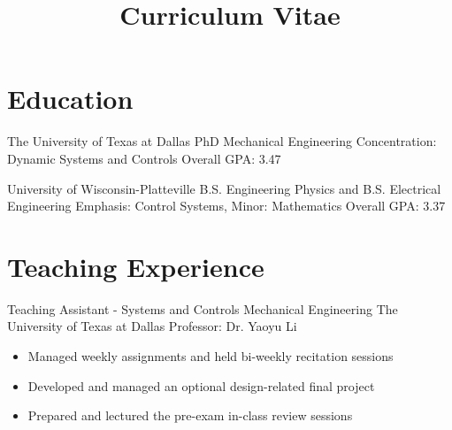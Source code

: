 \documentclass[11pt,letterpaper,roman]{moderncv} %
\title{Curriculum Vitae}
\begin{document}

\makecvtitle %

\vspace{- 1 cm}

\section{Education}

{The University of Texas at Dallas}
{PhD Mechanical Engineering}{}
{Concentration: Dynamic Systems and Controls} 
{Overall GPA: 3.47}

{University of Wisconsin-Platteville}
{B.S. Engineering Physics and  B.S. Electrical Engineering}{}
{Emphasis: Control Systems, Minor: Mathematics} 
{Overall GPA: 3.37}




\section{Teaching Experience}

{Teaching Assistant - Systems and Controls}
{Mechanical Engineering}
{The University of Texas at Dallas}
{Professor: Dr. Yaoyu Li}
{\begin{itemize}
    \item Managed weekly assignments and held bi-weekly recitation sessions
    \item Developed and managed an optional design-related final project
    \item Prepared and lectured the pre-exam in-class review sessions
\end{itemize}}
\end{document}
